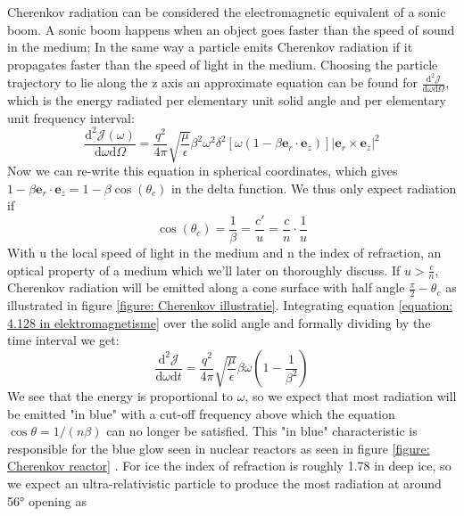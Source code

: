 Cherenkov radiation can be considered the electromagnetic equivalent of a sonic boom. 
A sonic boom happens when an object goes faster than the speed of sound in the
medium; In the same way a particle emits Cherenkov radiation if it propagates faster than 
the speed of light in the medium.  Choosing the particle trajectory to lie along the z
axis an approximate equation can be found\cite{jackson1998classical} for
$\frac{\text{d}^2 \mathscr{J}}{\text{d}\omega \text{d}\Omega}$, which is the energy
radiated per elementary unit solid angle and per elementary unit frequency
interval:
\begin{equation}
	\frac{\text{d}^2 \mathscr{J}(\omega)}{\text{d} \omega \text{d} \Omega} = \frac{q^2}{4\pi}\sqrt{\frac{\mu}{\epsilon}}\beta^2\omega^2\delta^2[\omega(1-\beta \mathbf{e}_r\cdot\mathbf{e}_z)]|\mathbf{e}_r\times\mathbf{e}_z|^2 \label{equation: 4.128 in elektromagnetisme}
\end{equation}
Now we can re-write this equation in spherical coordinates, which gives $1-\beta \mathbf{e}_r\cdot\mathbf{e}_z = 1-\beta\cos(\theta_c)$ in the delta function. We thus only expect radiation if
\begin{equation}
\cos(\theta_c) = \frac{1}{\beta} = \frac{c'}{u} = \frac{c}{n}\cdot\frac{1}{u}
\end{equation}
With u the local speed of light in the medium and n the index of refraction, an optical
property of a medium which we'll later on thoroughly discuss.
If $u>\frac{c}{n}$, Cherenkov radiation will
be emitted along a cone surface with half angle $\frac{\pi}{2}-\theta_c$ as
illustrated in figure \ref{figure: Cherenkov illustratie}. Integrating equation
\ref{equation: 4.128 in elektromagnetisme} over the solid angle and formally
dividing by the time interval we get:
\begin{equation}
	\frac{\text{d}^2\mathscr{J}}{\text{d}\omega \text{d}t} = \frac{q^2}{4\pi}\sqrt{\frac{\mu}{\epsilon}}\beta\omega\left(1-\frac{1}{\beta^2}\right)	
\end{equation}
We see that the energy is proportional to $\omega$, so we expect that most
radiation will be emitted "in blue" with a cut-off frequency above which the
equation $\cos\theta = 1/(n\beta)$ can no longer be satisfied. This "in blue"
characteristic is responsible for the blue glow seen in nuclear reactors as
seen in figure \ref{figure: Cherenkov reactor} .  For ice the index of
refraction is roughly 1.78 in deep ice\cite{Bogorodsky1985}\cite{indexofrefrvalue}, 
so we expect an ultra-relativistic
particle to produce the most radiation at around 56° opening as 

